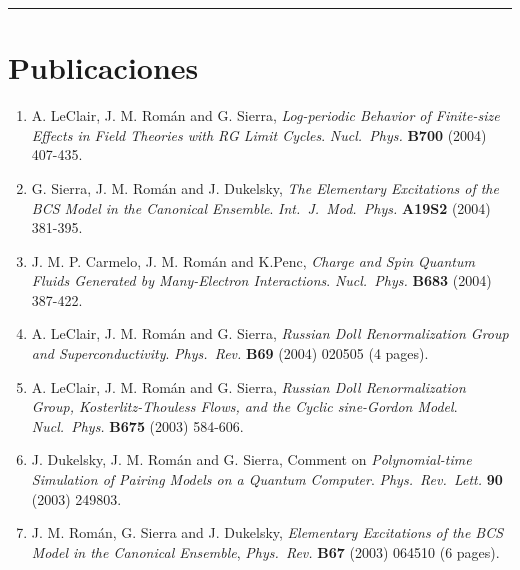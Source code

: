 \documentclass{article}
\begin{document}

\bigskip

\hrule

\newpage


\section*{Publicaciones}

\begin{enumerate}
\item A. LeClair, J. M. Rom\'an and G. Sierra,
{\it Log-periodic Behavior of Finite-size Effects in Field Theories with RG Limit Cycles}.
{\it Nucl.~Phys.} {\bf B700} (2004) 407-435.

\item G. Sierra, J. M. Rom\'an and J. Dukelsky, 
{\it The Elementary Excitations of the BCS Model in the Canonical Ensemble}.
{\it Int.~J.~Mod.~Phys.} {\bf A19S2} (2004) 381-395.

\item J. M. P. Carmelo, J. M. Rom\'{a}n and K.Penc,
{\it Charge and Spin Quantum Fluids Generated by Many-Electron Interactions}.
{\it Nucl.~Phys.} {\bf B683} (2004) 387-422.

\item A. LeClair, J. M. Rom\'{a}n and G. Sierra, 
{\it Russian Doll Renormalization Group and Superconductivity}. 
{\it Phys.~Rev.} {\bf B69} (2004) 020505 (4 pages).

\item A. LeClair, J. M. Rom\'{a}n and G. Sierra, 
{\it Russian Doll Renormalization Group, Kosterlitz-Thouless Flows, 
and the Cyclic sine-Gordon Model}. 
{\it Nucl.~Phys.} {\bf B675} (2003) 584-606.

\item J. Dukelsky, J. M. Rom\'an and G. Sierra,
Comment on {\it Polynomial-time Simulation of Pairing Models 
on a Quantum Computer}.
{\it Phys.~Rev.~Lett.} {\bf 90} (2003) 249803.

\item J. M. Rom\'an, G. Sierra and J. Dukelsky, 
{\it Elementary Excitations of the BCS Model in the Canonical Ensemble},
{\it Phys.~Rev.} {\bf B67} (2003) 064510 (6 pages).


\end{enumerate}
\end{document}
